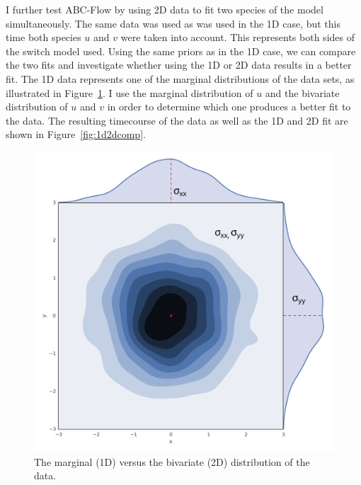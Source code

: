 I further test ABC-Flow by using 2D data to fit two species of the model simultaneously. The same data was used as was used in the 1D case, but this time both species $u$ and $v$ were taken into account. This represents both sides of the switch model used. Using the same priors as in the 1D case, we can compare the two fits and investigate whether using the 1D or 2D data results in a better fit. The 1D data represents one of the marginal distributions of the data sets, as illustrated in Figure~\ref{fig:1d2dsketch}. I use the marginal distribution of $u$ and the bivariate distribution of $u$ and $v$ in order to determine which one produces a better fit to the data. The resulting timecourse of the data as well as the 1D and 2D fit are shown in Figure~\ref{fig:1d2dcomp}.


\begin{figure}[htbp]
\centering
\includegraphics[scale=0.3]{chapterABCFlow/images/normal_sigma_example.png}
\caption[LoF caption]{\label{fig:1d2dsketch} The marginal (1D) versus the bivariate (2D) distribution of the data.}
\end{figure}




